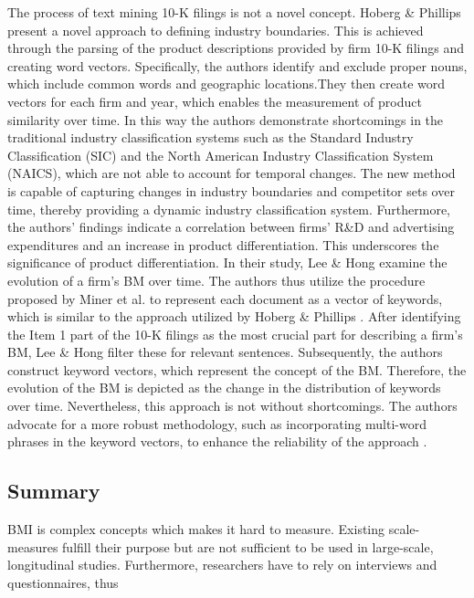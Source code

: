 \documentclass[manuscript,screen,review]{acmart}
\begin{document}
The process of text mining 10-K filings is not a novel concept. Hoberg
\& Phillips \citeyearpar{hoberg_text-based_2016} present a novel
approach to defining industry boundaries. This is achieved through the
parsing of the product descriptions provided by firm 10-K filings and
creating word vectors. Specifically, the authors identify and exclude
proper nouns, which include common words and geographic locations.They
then create word vectors for each firm and year, which enables the
measurement of product similarity over time. In this way the authors
demonstrate shortcomings in the traditional industry classification
systems such as the Standard Industry Classification (SIC) and the North
American Industry Classification System (NAICS), which are not able to
account for temporal changes. The new method is capable of capturing
changes in industry boundaries and competitor sets over time, thereby
providing a dynamic industry classification system. Furthermore, the
authors' findings indicate a correlation between firms' R\&D and
advertising expenditures and an increase in product differentiation.
This underscores the significance of product differentiation. In their
study, Lee \& Hong \citeyearpar{lee_business_2014} examine the evolution
of a firm's BM over time. The authors thus utilize the procedure
proposed by Miner et al. \citeyearpar{miner_practical_2012} to represent
each document as a vector of keywords, which is similar to the approach
utilized by Hoberg \& Phillips \citeyearpar{hoberg_text-based_2016}.
After identifying the Item 1 part of the 10-K filings as the most
crucial part for describing a firm's BM, Lee \& Hong
\citeyearpar{lee_business_2014} filter these for relevant sentences.
Subsequently, the authors construct keyword vectors, which represent the
concept of the BM. Therefore, the evolution of the BM is depicted as the
change in the distribution of keywords over time. Nevertheless, this
approach is not without shortcomings. The authors advocate for a more
robust methodology, such as incorporating multi-word phrases in the
keyword vectors, to enhance the reliability of the approach
\citep{lee_business_2014}.

\subsection{Summary}\label{summary}

BMI is complex concepts which makes it hard to measure. Existing
scale-measures fulfill their purpose but are not sufficient to be used
in large-scale, longitudinal studies. Furthermore, researchers have to
rely on interviews and questionnaires, thus
\end{document}
